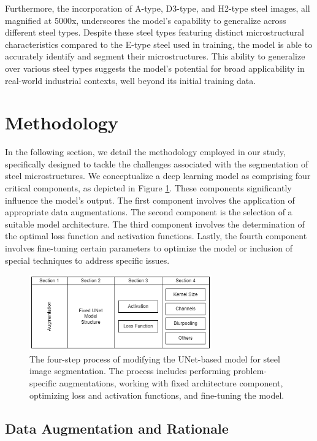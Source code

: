 \documentclass[]{article}
\begin{document}
Furthermore, the incorporation of A-type, D3-type, and H2-type steel images, all magnified at 5000x, underscores the model's capability to generalize across different steel types. Despite these steel types featuring distinct microstructural characteristics compared to the E-type steel used in training, the model is able to accurately identify and segment their microstructures. This ability to generalize over various steel types suggests the model's potential for broad applicability in real-world industrial contexts, well beyond its initial training data.

\section{Methodology}
In the following section, we detail the methodology employed in our study, specifically designed to tackle the challenges associated with the segmentation of steel microstructures. We conceptualize a deep learning model as comprising four critical components, as depicted in Figure \ref{fig:imageSections}. These components significantly influence the model's output. The first component involves the application of appropriate data augmentations. The second component is the selection of a suitable model architecture. The third component involves the determination of the optimal loss function and activation functions. Lastly, the fourth component involves fine-tuning certain parameters to optimize the model or inclusion of special techniques to address specific issues.

\begin{figure}[ht]
	\centering
	\includegraphics[width=0.7\textwidth]{images/sections.png}
	\caption{The four-step process of modifying the UNet-based model for steel image segmentation. The process includes performing problem-specific augmentations, working with fixed architecture component, optimizing loss and activation functions, and fine-tuning the model.}
	\label{fig:imageSections}
\end{figure}

\subsection{Data Augmentation and Rationale}
\end{document}
